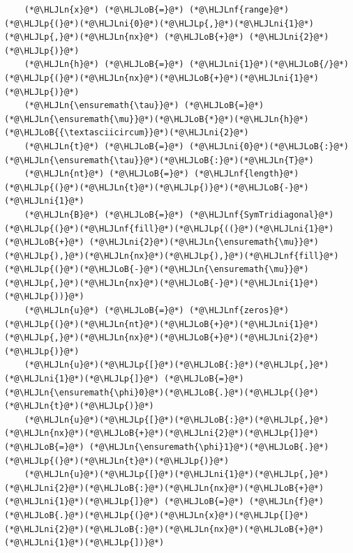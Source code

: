 \documentclass[12pt,a4paper]{article}
\newcommand{\HLJLn}[1]{#1}
\newcommand{\HLJLnf}[1]{\textcolor[RGB]{66,102,213}{#1}}
\newcommand{\HLJLni}[1]{\textcolor[RGB]{59,151,46}{#1}}
\newcommand{\HLJLoB}[1]{\textcolor[RGB]{102,102,102}{\textbf{#1}}}
\newcommand{\HLJLp}[1]{#1}
\begin{document}
\begin{lstlisting}
    (*@\HLJLn{x}@*) (*@\HLJLoB{=}@*) (*@\HLJLnf{range}@*)(*@\HLJLp{(}@*)(*@\HLJLni{0}@*)(*@\HLJLp{,}@*)(*@\HLJLni{1}@*)(*@\HLJLp{,}@*)(*@\HLJLn{nx}@*) (*@\HLJLoB{+}@*) (*@\HLJLni{2}@*)(*@\HLJLp{)}@*)
    (*@\HLJLn{h}@*) (*@\HLJLoB{=}@*) (*@\HLJLni{1}@*)(*@\HLJLoB{/}@*)(*@\HLJLp{(}@*)(*@\HLJLn{nx}@*)(*@\HLJLoB{+}@*)(*@\HLJLni{1}@*)(*@\HLJLp{)}@*)
    (*@\HLJLn{\ensuremath{\tau}}@*) (*@\HLJLoB{=}@*) (*@\HLJLn{\ensuremath{\mu}}@*)(*@\HLJLoB{*}@*)(*@\HLJLn{h}@*)(*@\HLJLoB{{\textasciicircum}}@*)(*@\HLJLni{2}@*)
    (*@\HLJLn{t}@*) (*@\HLJLoB{=}@*) (*@\HLJLni{0}@*)(*@\HLJLoB{:}@*)(*@\HLJLn{\ensuremath{\tau}}@*)(*@\HLJLoB{:}@*)(*@\HLJLn{T}@*)
    (*@\HLJLn{nt}@*) (*@\HLJLoB{=}@*) (*@\HLJLnf{length}@*)(*@\HLJLp{(}@*)(*@\HLJLn{t}@*)(*@\HLJLp{)}@*)(*@\HLJLoB{-}@*)(*@\HLJLni{1}@*)
    (*@\HLJLn{B}@*) (*@\HLJLoB{=}@*) (*@\HLJLnf{SymTridiagonal}@*)(*@\HLJLp{(}@*)(*@\HLJLnf{fill}@*)(*@\HLJLp{((}@*)(*@\HLJLni{1}@*) (*@\HLJLoB{+}@*) (*@\HLJLni{2}@*)(*@\HLJLn{\ensuremath{\mu}}@*)(*@\HLJLp{),}@*)(*@\HLJLn{nx}@*)(*@\HLJLp{),}@*)(*@\HLJLnf{fill}@*)(*@\HLJLp{(}@*)(*@\HLJLoB{-}@*)(*@\HLJLn{\ensuremath{\mu}}@*)(*@\HLJLp{,}@*)(*@\HLJLn{nx}@*)(*@\HLJLoB{-}@*)(*@\HLJLni{1}@*)(*@\HLJLp{))}@*)
    (*@\HLJLn{u}@*) (*@\HLJLoB{=}@*) (*@\HLJLnf{zeros}@*)(*@\HLJLp{(}@*)(*@\HLJLn{nt}@*)(*@\HLJLoB{+}@*)(*@\HLJLni{1}@*)(*@\HLJLp{,}@*)(*@\HLJLn{nx}@*)(*@\HLJLoB{+}@*)(*@\HLJLni{2}@*)(*@\HLJLp{)}@*)
    (*@\HLJLn{u}@*)(*@\HLJLp{[}@*)(*@\HLJLoB{:}@*)(*@\HLJLp{,}@*)(*@\HLJLni{1}@*)(*@\HLJLp{]}@*) (*@\HLJLoB{=}@*) (*@\HLJLn{\ensuremath{\phi}0}@*)(*@\HLJLoB{.}@*)(*@\HLJLp{(}@*)(*@\HLJLn{t}@*)(*@\HLJLp{)}@*)
    (*@\HLJLn{u}@*)(*@\HLJLp{[}@*)(*@\HLJLoB{:}@*)(*@\HLJLp{,}@*)(*@\HLJLn{nx}@*)(*@\HLJLoB{+}@*)(*@\HLJLni{2}@*)(*@\HLJLp{]}@*) (*@\HLJLoB{=}@*) (*@\HLJLn{\ensuremath{\phi}1}@*)(*@\HLJLoB{.}@*)(*@\HLJLp{(}@*)(*@\HLJLn{t}@*)(*@\HLJLp{)}@*)
    (*@\HLJLn{u}@*)(*@\HLJLp{[}@*)(*@\HLJLni{1}@*)(*@\HLJLp{,}@*)(*@\HLJLni{2}@*)(*@\HLJLoB{:}@*)(*@\HLJLn{nx}@*)(*@\HLJLoB{+}@*)(*@\HLJLni{1}@*)(*@\HLJLp{]}@*) (*@\HLJLoB{=}@*) (*@\HLJLn{f}@*)(*@\HLJLoB{.}@*)(*@\HLJLp{(}@*)(*@\HLJLn{x}@*)(*@\HLJLp{[}@*)(*@\HLJLni{2}@*)(*@\HLJLoB{:}@*)(*@\HLJLn{nx}@*)(*@\HLJLoB{+}@*)(*@\HLJLni{1}@*)(*@\HLJLp{])}@*)


\end{lstlisting}
\end{document}
